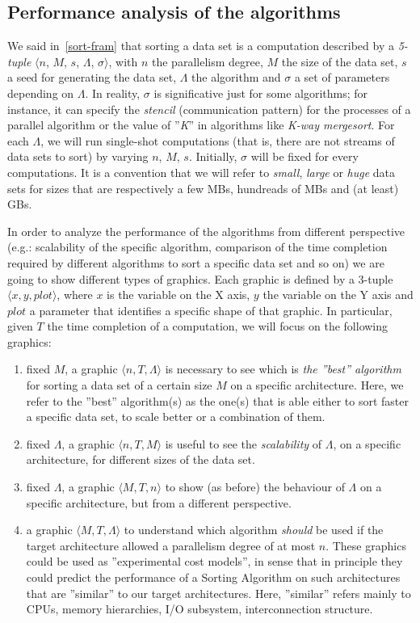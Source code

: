 \subsection{Performance analysis of the algorithms}
\label{performance-analysys}
We said in~\ref{sort-fram} that sorting a data set is a computation described by a \textit{5-tuple} $\langle n$, $M$, $s$, $\Lambda$, $\sigma \rangle$, with $n$ the parallelism degree, $M$ the size of the data set, $s$ a seed for generating the data set, $\Lambda$ the algorithm and $\sigma$ a set of parameters depending on $\Lambda$. In reality, $\sigma$ is significative just for some algorithms; for instance, it can specify the \textit{stencil} (communication pattern) for the processes of a parallel algorithm or the value of ''\textit{K}'' in algorithms like \textit{K-way mergesort}. For each $\Lambda$, we will run single-shot computations (that is, there are not streams of data sets to sort) by varying $n$, $M$, $s$. Initially, $\sigma$ will be fixed for every computations. It is a convention that we will refer to \textit{small}, \textit{large} or \textit{huge} data sets for sizes that are respectively a few MBs, hundreads of MBs and (at least) GBs. 

In order to analyze the performance of the algorithms from different perspective (e.g.: scalability of the specific algorithm, comparison of the time completion required by different algorithms to sort a specific data set and so on) we are going to show different types of graphics. Each graphic is defined by a 3-tuple $\langle x, y, plot \rangle $, where $x$ is the variable on the X axis, $y$ the variable on the Y axis and $plot$ a parameter that identifies a specific shape of that graphic. In particular, given $T$ the time completion of a computation, we will focus on the following graphics:
\begin{enumerate}
\item fixed $M$, a graphic $\langle n, T, \Lambda \rangle $ is necessary to see which is \textit{the ''best'' algorithm} for sorting a data set of a certain size $M$ on a specific architecture. Here, we refer to the ''best'' algorithm(s) as the one(s) that is able either to sort faster a specific data set, to scale better or a combination of them. 
\item fixed $\Lambda$, a graphic $\langle n, T, M \rangle$ is useful to see the \textit{scalability} of $\Lambda$, on a specific architecture, for different sizes of the data set.
\item fixed $\Lambda$, a graphic $\langle M, T, n \rangle$ to show (as before) the behaviour of $\Lambda$ on a specific architecture, but from a different perspective. 
\item a graphic $\langle M, T, \Lambda \rangle$ to understand which algorithm \textit{should} be used if the target architecture allowed a parallelism degree of at most $n$. These graphics could be used as ''experimental cost models'', in sense that in principle they could predict the performance of a Sorting Algorithm on such architectures that are ''similar'' to our target architectures. Here, ''similar'' refers mainly to CPUs, memory hierarchies, I/O subsystem, interconnection structure.  
\end{enumerate}

